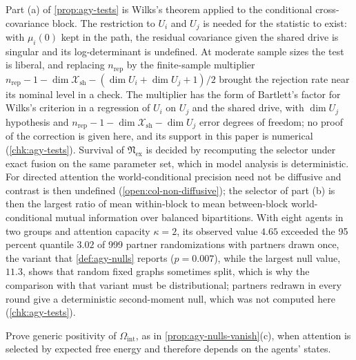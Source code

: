 Part (a) of \cref{prop:agy-tests} is Wilks's theorem \citep{wilks1938large} applied to the conditional cross-covariance block. The restriction to $U_i$ and $U_j$ is needed for the statistic to exist: with $\mu_i(0)$ kept in the path, the residual covariance given the shared drive is singular and its log-determinant is undefined. At moderate sample sizes the test is liberal, and replacing $n_{\mathrm{rep}}$ by the finite-sample multiplier $n_{\mathrm{rep}}-1-\dim\mathcal X_{\mathrm{sh}}-(\dim U_i+\dim U_j+1)/2$ brought the rejection rate near its nominal level in a check. The multiplier has the form of Bartlett's factor for Wilks's criterion in a regression of $U_i$ on $U_j$ and the shared drive, with $\dim U_j$ hypothesis and $n_{\mathrm{rep}}-1-\dim\mathcal X_{\mathrm{sh}}-\dim U_j$ error degrees of freedom; no proof of the correction is given here, and its support in this paper is numerical (\cref{chk:agy-tests}). Survival of $\mathfrak N_{\mathrm{ex}}$ is decided by recomputing the selector under exact fusion on the same parameter set, which in model analysis is deterministic. For directed attention the world-conditional precision need not be diffusive and contrast is then undefined (\cref{open:col-non-diffusive}); the selector of part (b) is then the largest ratio of mean within-block to mean between-block world-conditional mutual information over balanced bipartitions. With eight agents in two groups and attention capacity $\kappa=2$, its observed value $4.65$ exceeded the 95 percent quantile $3.02$ of 999 partner randomizations with partners drawn once, the variant that \cref{def:agy-nulls} reports ($p=0.007$), while the largest null value, $11.3$, shows that random fixed graphs sometimes split, which is why the comparison with that variant must be distributional; partners redrawn in every round give a deterministic second-moment null, which was not computed here (\cref{chk:agy-tests}).

\begin{openproblem}\label{open:agy-attention-positivity}
Prove generic positivity of $\Omega_{\mathrm{int}}$, as in \cref{prop:agy-nulls-vanish}(c), when attention is selected by expected free energy and therefore depends on the agents' states.
\end{openproblem}

